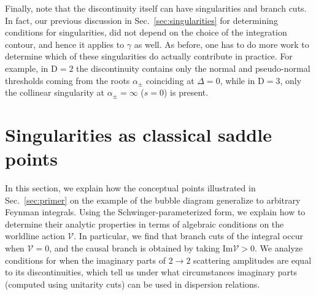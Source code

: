 \documentclass[12pt]{article}
\numberwithin{figure}{section}
\def \D {\mathrm{D}}
\def \Im {\mathrm{Im}}
\begin{document}
	Finally, note that the discontinuity itself can have singularities and branch cuts. In fact, our previous discussion in Sec.~\ref{sec:singularities} for determining conditions for singularities, did not depend on the choice of the integration contour, and hence it applies to $\gamma$ as well. As before, one has to do more work to determine which of these singularities do actually contribute in practice. For example, in $\D=2$ the discontinuity contains only the normal and pseudo-normal thresholds coming from the roots $\alpha_\pm$ coinciding at $\Delta=0$, while in $\D=3$, only the collinear singularity at $\alpha_\pm = \infty$ ($s=0$) is present.
	

	\newpage
	\section{\label{sec:general}Singularities as classical saddle points}
	
	
	In this section, we explain how the conceptual points illustrated in Sec.~\ref{sec:primer} on the example of the bubble diagram generalize to arbitrary Feynman integrals. Using the Schwinger-parameterized form, we explain how to determine their analytic properties in terms of algebraic conditions on the worldline action $\mathcal{V}$. In particular, we find that branch cuts of the integral occur when $\mathcal{V}=0$, and the causal branch is obtained by taking $\Im \mathcal{V} > 0$. We analyze conditions for when the imaginary parts of $2\to2$ scattering amplitudes are equal to its discontinuities, which tell us under what circumstances imaginary parts (computed using unitarity cuts) can be used in dispersion relations.
	
\end{document}
